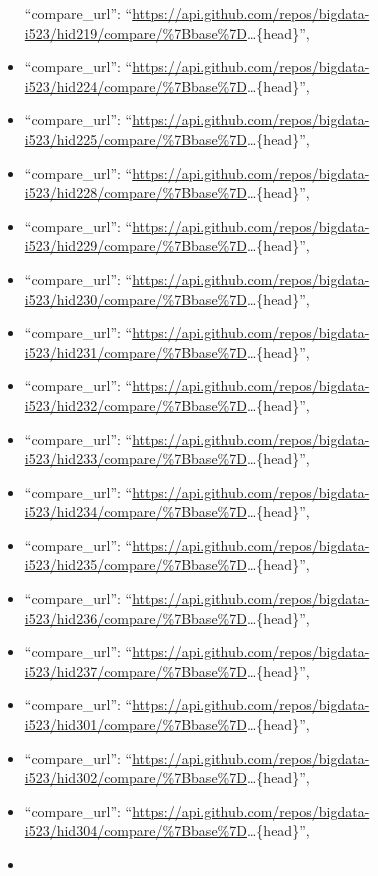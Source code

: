\begin{itemize}
  ``compare\_url'':
  ``\url{https://api.github.com/repos/bigdata-i523/hid219/compare/\%7Bbase\%7D}\ldots{}\{head\}'',
\item
  ``compare\_url'':
  ``\url{https://api.github.com/repos/bigdata-i523/hid224/compare/\%7Bbase\%7D}\ldots{}\{head\}'',
\item
  ``compare\_url'':
  ``\url{https://api.github.com/repos/bigdata-i523/hid225/compare/\%7Bbase\%7D}\ldots{}\{head\}'',
\item
  ``compare\_url'':
  ``\url{https://api.github.com/repos/bigdata-i523/hid228/compare/\%7Bbase\%7D}\ldots{}\{head\}'',
\item
  ``compare\_url'':
  ``\url{https://api.github.com/repos/bigdata-i523/hid229/compare/\%7Bbase\%7D}\ldots{}\{head\}'',
\item
  ``compare\_url'':
  ``\url{https://api.github.com/repos/bigdata-i523/hid230/compare/\%7Bbase\%7D}\ldots{}\{head\}'',
\item
  ``compare\_url'':
  ``\url{https://api.github.com/repos/bigdata-i523/hid231/compare/\%7Bbase\%7D}\ldots{}\{head\}'',
\item
  ``compare\_url'':
  ``\url{https://api.github.com/repos/bigdata-i523/hid232/compare/\%7Bbase\%7D}\ldots{}\{head\}'',
\item
  ``compare\_url'':
  ``\url{https://api.github.com/repos/bigdata-i523/hid233/compare/\%7Bbase\%7D}\ldots{}\{head\}'',
\item
  ``compare\_url'':
  ``\url{https://api.github.com/repos/bigdata-i523/hid234/compare/\%7Bbase\%7D}\ldots{}\{head\}'',
\item
  ``compare\_url'':
  ``\url{https://api.github.com/repos/bigdata-i523/hid235/compare/\%7Bbase\%7D}\ldots{}\{head\}'',
\item
  ``compare\_url'':
  ``\url{https://api.github.com/repos/bigdata-i523/hid236/compare/\%7Bbase\%7D}\ldots{}\{head\}'',
\item
  ``compare\_url'':
  ``\url{https://api.github.com/repos/bigdata-i523/hid237/compare/\%7Bbase\%7D}\ldots{}\{head\}'',
\item
  ``compare\_url'':
  ``\url{https://api.github.com/repos/bigdata-i523/hid301/compare/\%7Bbase\%7D}\ldots{}\{head\}'',
\item
  ``compare\_url'':
  ``\url{https://api.github.com/repos/bigdata-i523/hid302/compare/\%7Bbase\%7D}\ldots{}\{head\}'',
\item
  ``compare\_url'':
  ``\url{https://api.github.com/repos/bigdata-i523/hid304/compare/\%7Bbase\%7D}\ldots{}\{head\}'',
\item

\end{itemize}
